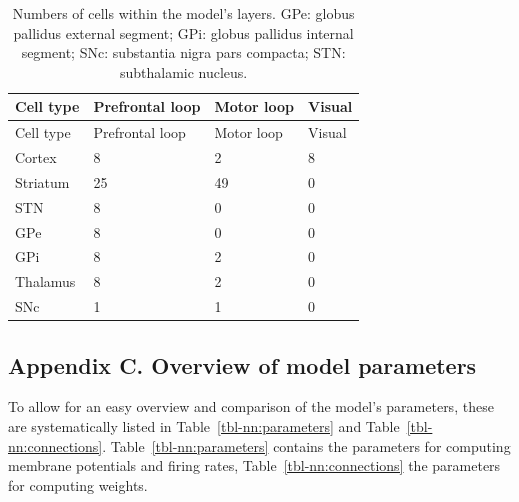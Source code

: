 \documentclass[
  11pt,
  a4paper,
]{scrbook}
\begin{document}
\begin{longtable}[]{@{}llll@{}}
\caption{Numbers of cells within the model's layers. GPe: globus
pallidus external segment; GPi: globus pallidus internal segment; SNc:
substantia nigra pars compacta; STN: subthalamic
nucleus.}\label{tbl-nn:numbercells}\tabularnewline
\toprule\noalign{}
Cell type & Prefrontal loop & Motor loop & Visual \\
\midrule\noalign{}
\endfirsthead
\toprule\noalign{}
Cell type & Prefrontal loop & Motor loop & Visual \\
\midrule\noalign{}
\endhead
\bottomrule\noalign{}
\endlastfoot
Cortex & 8 & 2 & 8 \\
Striatum & 25 & 49 & 0 \\
STN & 8 & 0 & 0 \\
GPe & 8 & 0 & 0 \\
GPi & 8 & 2 & 0 \\
Thalamus & 8 & 2 & 0 \\
SNc & 1 & 1 & 0 \\
\end{longtable}

\subsection*{Appendix C. Overview of model
parameters}\label{appendix-c.-overview-of-model-parameters}

To allow for an easy overview and comparison of the model's parameters,
these are systematically listed in Table~\ref{tbl-nn:parameters} and
Table~\ref{tbl-nn:connections}. Table~\ref{tbl-nn:parameters} contains
the parameters for computing membrane potentials and firing rates,
Table~\ref{tbl-nn:connections} the parameters for computing weights.
\end{document}
